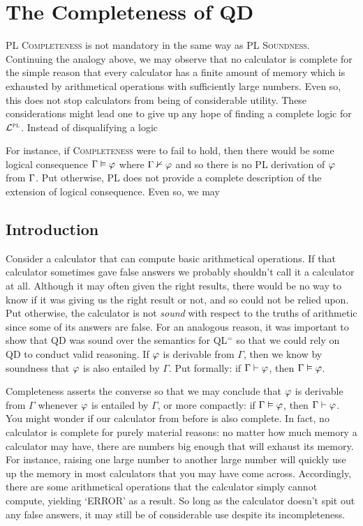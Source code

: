 ﻿%
\chapter{The Completeness of QD}
\label{ch.QDcomplete}


\textsc{PL Completeness} is not mandatory in the same way as \textsc{PL Soundness}.
Continuing the analogy above, we may observe that no calculator is complete for the simple reason that every calculator has a finite amount of memory which is exhausted by arithmetical operations with sufficiently large numbers.
Even so, this does not stop calculators from being of considerable utility.
These considerations might lead one to give up any hope of finding a complete logic for $\mathcal{L}^{\textsc{pl}}$.
Instead of disqualifying a logic 

For instance, if \textsc{Completeness} were to fail to hold, then there would be some logical consequence $\Gamma \vDash \varphi$ where $\Gamma \nvdash \varphi$ and so there is no PL derivation of $\varphi$ from $\Gamma$.
Put otherwise, PL does not provide a complete description of the extension of logical consequence.
Even so, we may 

\section{Introduction}
  \label{sec:Introduction}

Consider a calculator that can compute basic arithmetical operations.
If that calculator sometimes gave false answers we probably shouldn't call it a calculator at all.
Although it may often given the right results, there would be no way to know if it was giving us the right result or not, and so could not be relied upon.
Put otherwise, the calculator is not \textit{sound} with respect to the truths of arithmetic since some of its answers are false.
For an analogous reason, it was important to show that QD was sound over the semantics for QL$^=$ so that we could rely on QD to conduct valid reasoning.
If $\varphi$ is derivable from $\Gamma$, then we know by soundness that $\varphi$ is also entailed by $\Gamma$.
Put formally: if $\Gamma\vdash\varphi$, then $\Gamma\vDash\varphi$.

Completeness asserts the converse so that we may conclude that $\varphi$ is derivable from $\Gamma$ whenever $\varphi$ is entailed by $\Gamma$, or more compactly: if $\Gamma\vDash\varphi$, then $\Gamma\vdash\varphi$.
You might wonder if our calculator from before is also complete.
In fact, no calculator is complete for purely material reasons: no matter how much memory a calculator may have, there are numbers big enough that will exhaust its memory.
For instance, raising one large number to another large number will quickly use up the memory in most calculators that you may have come across.
Accordingly, there are some arithmetical operations that the calculator simply cannot compute, yielding `ERROR' as a result.
So long as the calculator doesn't spit out any false answers, it may still be of considerable use despite its incompleteness.

